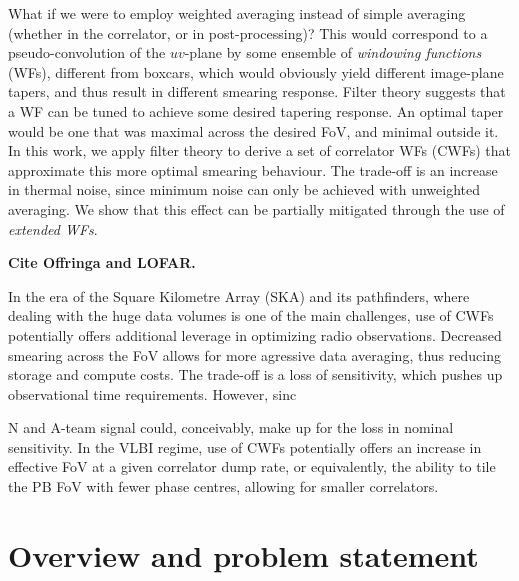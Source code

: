 \documentclass[useAMS,usenatbib]{mn2e}
\begin{document}
What if we were to employ weighted averaging instead of simple averaging (whether in the correlator, or in post-processing)? 
This would correspond to a  pseudo-convolution of the $uv$-plane by some ensemble of \emph{windowing functions} (WFs), 
different from boxcars, which would obviously yield different image-plane tapers, and thus result in different 
smearing response. Filter theory suggests that a WF can be tuned to achieve some desired tapering response. 
An optimal taper would be one that was maximal across the desired FoV, and minimal outside it. In this work, 
we apply filter theory to derive a set of correlator WFs (CWFs) that approximate this more optimal smearing 
behaviour. The trade-off is an increase in thermal noise, since minimum noise can only be achieved with 
unweighted averaging. We show that this effect can be partially mitigated through the use of \emph{extended WFs}. 

{\bf Cite Offringa and LOFAR.}

In the era of the Square Kilometre Array (SKA) and its pathfinders, where dealing with the huge data volumes is one of
the main challenges, use of CWFs potentially offers additional leverage in optimizing radio observations. 
Decreased smearing across the FoV allows for more agressive data averaging, thus reducing storage and compute costs. 
The trade-off is a loss of sensitivity, which pushes up observational time requirements. However, sinc

 N and A-team signal 
could, conceivably, make up for the loss in nominal sensitivity. In the VLBI regime, use of CWFs potentially offers an increase in 
effective FoV at a given correlator dump rate, or equivalently, the ability to tile the PB FoV with fewer phase centres, allowing
for smaller correlators.

\section{Overview and problem statement}

\newcommand{\VV}{\mathcal{V}}
\newcommand{\WW}{\mathcal{W}}
\newcommand{\II}{\mathcal{I}}
\newcommand{\IID}{\mathcal{I}^\mathrm{D}}
\newcommand{\IIDI}{\mathcal{I}^\mathrm{DI}}
\newcommand{\EE}{\mathcal{E}}
\newcommand{\FF}{\mathcal{F}}
\newcommand{\HH}{\mathcal{H}}
\newcommand{\TT}{\mathcal{T}}
\newcommand{\NN}{\mathcal{N}}
\newcommand{\uu}{\bmath{u}}
\newcommand{\Btf}{\mathsf{B}^{[\Delta t\Delta\nu]}}
\newcommand{\Babtf}{\mathsf{B}^{[\alpha\Delta t,\beta\Delta\nu]}}
\newcommand{\Bab}{\mathsf{B}^{[\alpha\beta]}}
\newcommand{\Buv}{\mathsf{B}^{[uv]}}
\newcommand{\Bij}{\mathsf{B}}
\newcommand{\Ptf}{\Pi^{[t\nu]}}
\newcommand{\Puv}{\Pi^{[uv]}}
\newcommand{\Vm}{V^\mathrm{(m)}}
\newcommand{\Vs}{V^\mathrm{(s)}}
\end{document}
